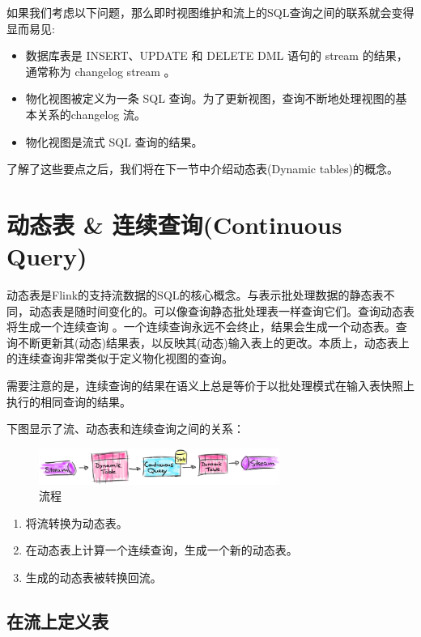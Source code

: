 \documentclass[cn,11pt,chinese]{elegantbook}
\begin{document}
如果我们考虑以下问题，那么即时视图维护和流上的SQL查询之间的联系就会变得显而易见:

\begin{itemize}
  \item 数据库表是 INSERT、UPDATE 和 DELETE DML 语句的 stream 的结果，通常称为 changelog stream 。
  \item 物化视图被定义为一条 SQL 查询。为了更新视图，查询不断地处理视图的基本关系的changelog 流。
  \item 物化视图是流式 SQL 查询的结果。
\end{itemize}

了解了这些要点之后，我们将在下一节中介绍动态表(Dynamic tables)的概念。

\section{动态表 \& 连续查询(Continuous Query)}

动态表是Flink的支持流数据的SQL的核心概念。与表示批处理数据的静态表不同，动态表是随时间变化的。可以像查询静态批处理表一样查询它们。查询动态表将生成一个连续查询 。一个连续查询永远不会终止，结果会生成一个动态表。查询不断更新其(动态)结果表，以反映其(动态)输入表上的更改。本质上，动态表上的连续查询非常类似于定义物化视图的查询。

需要注意的是，连续查询的结果在语义上总是等价于以批处理模式在输入表快照上执行的相同查询的结果。

下图显示了流、动态表和连续查询之间的关系：

\begin{figure}[htbp]
    \centering
    \includegraphics[width=0.7\textwidth]{images/stream-query-stream.png}
    \caption{流程}
\end{figure}

\begin{enumerate}
    \item 将流转换为动态表。
    \item 在动态表上计算一个连续查询，生成一个新的动态表。
    \item 生成的动态表被转换回流。
\end{enumerate}

\subsection{在流上定义表}
\end{document}
